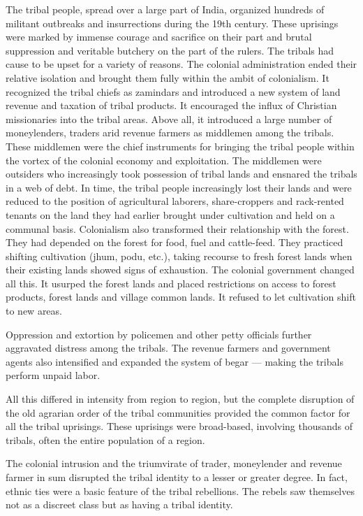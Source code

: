 The tribal people, spread over a large part of India, organized hundreds of militant outbreaks and insurrections during the 19th century. These uprisings were marked by immense courage and sacrifice on their part and brutal suppression and veritable butchery on the part of the rulers. The tribals had cause to be upset for a variety of reasons. The colonial administration ended their relative isolation and brought them fully within the ambit of colonialism. It recognized the tribal chiefs as zamindars and introduced a new system of land revenue and taxation of tribal products. It encouraged the influx of Christian missionaries into the tribal areas. Above all, it introduced a large number of moneylenders, traders arid revenue farmers as middlemen among the tribals. These middlemen were the chief instruments for bringing the tribal people within the vortex of the colonial economy and exploitation. The middlemen were outsiders who increasingly took possession of tribal lands and ensnared the tribals in a web of debt. In time, the tribal people increasingly lost their lands and were reduced to the position of agricultural laborers, share-croppers and rack-rented tenants on the land they had earlier brought under cultivation and held on a communal basis. Colonialism also transformed their relationship with the forest. They had depended on the forest for food, fuel and cattle-feed. They practiced shifting cultivation (jhum, podu, etc.), taking recourse to fresh forest lands when their existing lands showed signs of exhaustion. The colonial government changed all this. It usurped the forest lands and placed restrictions on access to forest products, forest lands and village common lands. It refused to let cultivation shift to new areas.

Oppression and extortion by policemen and other petty officials further aggravated distress among the tribals. The revenue farmers and government agents also intensified and expanded the system of begar --- making the tribals perform unpaid labor.

All this differed in intensity from region to region, but the complete disruption of the old agrarian order of the tribal communities provided the common factor for all the tribal uprisings. These uprisings were broad-based, involving thousands of tribals, often the entire population of a region.

The colonial intrusion and the triumvirate of trader, moneylender and revenue farmer in sum disrupted the tribal identity to a lesser or greater degree. In fact, ethnic ties were a basic feature of the tribal rebellions. The rebels saw themselves not as a discreet class but as having a tribal identity.

